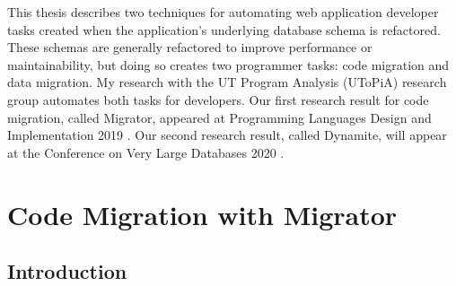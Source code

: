 \documentclass[]{article}
\begin{document}
        This thesis describes two techniques for automating web application developer tasks created when the application's underlying database schema is refactored. These schemas are generally refactored to improve performance or maintainability, but doing so creates two programmer tasks: code migration and data migration. My research with the UT Program Analysis (UToPiA) research group automates both tasks for developers. Our first research result for code migration, called Migrator, appeared at Programming Languages Design and Implementation 2019 \cite{pldi19}. Our second research result, called Dynamite, will appear at the Conference on Very Large Databases 2020 \cite{vldb20}.







    \section{Code Migration with Migrator}

        \subsection{Introduction}
\end{document}
